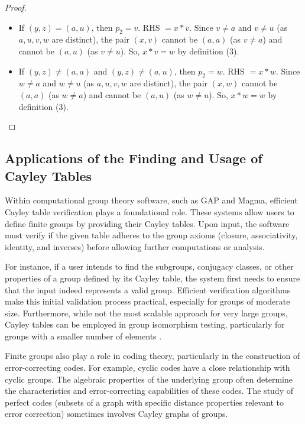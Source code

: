 \documentclass[sigconf]{acmart}
\begin{document}
\begin{proof}
\begin{itemize}
\begin{itemize}
    \end{itemize}
    \item If $(y,z) = (a,u)$, then $p_2 = v$. RHS $= x \ast v$.
    Since $v \neq a$ and $v \neq u$ (as $a,u,v,w$ are distinct), the pair $(x,v)$ cannot be $(a,a)$ (as $v \neq a$) and cannot be $(a,u)$ (as $v \neq u$). So, $x \ast v = w$ by definition (3).
    \item If $(y,z) \neq (a,a)$ and $(y,z) \neq (a,u)$, then $p_2 = w$. RHS $= x \ast w$.
    Since $w \neq a$ and $w \neq u$ (as $a,u,v,w$ are distinct), the pair $(x,w)$ cannot be $(a,a)$ (as $w \neq a$) and cannot be $(a,u)$ (as $w \neq u$). So, $x \ast w = w$ by definition (3).
\end{itemize}

\end{proof}

\subsection{Applications of the Finding and Usage of Cayley Tables}

Within computational group theory software, such as GAP and Magma, efficient Cayley table verification plays a foundational role.
These systems allow users to define finite groups by providing their Cayley tables.
Upon input, the software must verify if the given table adheres to the group axioms (closure, associativity, identity, and inverses)
before allowing further computations or analysis. 

For instance, if a user intends to find the subgroups, conjugacy classes, or
other properties of a group defined by its Cayley table, the system first needs to ensure that the input indeed represents a valid group. 
Efficient verification algorithms make this initial validation process practical, especially for groups of moderate size. 
Furthermore, while not the most scalable approach for very large groups, Cayley tables can be employed in group isomorphism 
testing, particularly for groups with a smaller number of elements \cite{williams2015group}.

Finite groups also play a role in coding theory, particularly in the construction of error-correcting codes. For example, cyclic codes have a close 
relationship with cyclic groups. The algebraic properties of the underlying group often determine the characteristics and error-correcting
capabilities of these codes. The study of perfect codes (subsets of a graph with specific distance properties relevant to error correction)
sometimes involves Cayley graphs of groups.
\end{document}
